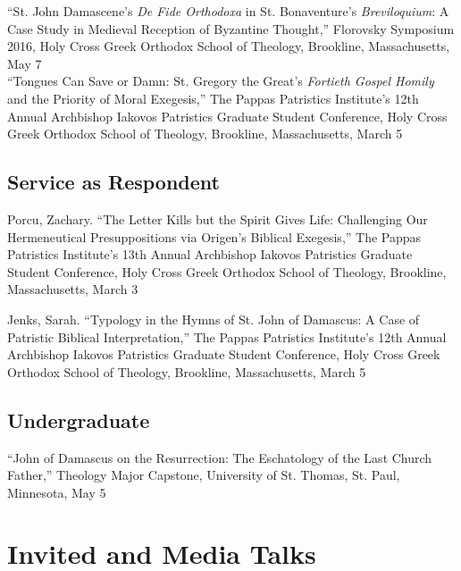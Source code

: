 \documentclass[letterpaper,12pt]{article}
\newcommand{\years}[1]{%
  {\reversemarginpar\strut\marginnote{{\small#1}}}%
}
\begin{document}
{{{{{{{%
``St. John Damascene's \emph{De Fide Orthodoxa} in St. Bonaventure's \emph{Breviloquium}: A Case Study in Medieval Reception of Byzantine Thought,'' Florovsky Symposium 2016, Holy Cross Greek Orthodox School of Theology, Brookline, Massachusetts, May 7 \\ [.3cm]
%
``Tongues Can Save or Damn: St. Gregory the Great's \emph{Fortieth Gospel Homily} and the Priority of Moral Exegesis,'' The Pappas Patristics Institute's 12th Annual Archbishop Iakovos Patristics Graduate Student Conference, Holy Cross Greek Orthodox School of Theology, Brookline, Massachusetts, March 5

\subsection*{Service as Respondent}

\years{2017}%
%
Porcu, Zachary. ``The Letter Kills but the Spirit Gives Life: Challenging Our Hermeneutical Presuppositions via Origen's Biblical Exegesis,'' The Pappas Patristics Institute's 13th Annual Archbishop Iakovos Patristics Graduate Student Conference, Holy Cross Greek Orthodox School of Theology, Brookline, Massachusetts, March 3 \\ [.3cm]
%
\years{2016}%
%
Jenks, Sarah. ``Typology in the Hymns of St. John of Damascus: A Case of Patristic Biblical Interpretation,'' The Pappas Patristics Institute's 12th Annual Archbishop Iakovos Patristics Graduate Student Conference, Holy Cross Greek Orthodox School of Theology, Brookline, Massachusetts, March 5

\subsection*{Undergraduate}

\years{2014}%
%
``John of Damascus on the Resurrection: The Eschatology of the Last Church Father,'' Theology Major Capstone, University of St. Thomas, St. Paul, Minnesota, May 5

\section*{Invited and Media Talks}

}}}}}}}
\end{document}
